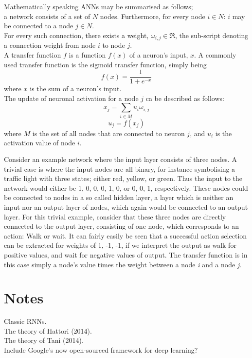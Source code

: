 \\
\\
Mathematically speaking ANNs may be summarised as follows;
\\
a network consists of a set of $N$ nodes. Furthermore, for every node $i\in N$: $i$ may be connected to a node $j \in N$.
\\
For every such connection, there exists a weight, $\omega_{i,j} \in \Re$, the sub-script denoting a connection weight from node $i$ to node $j$.
\\
A transfer function $f$ is a function $f(x)$ of a neuron's input, $x$. A commonly used transfer function is the sigmoid transfer function, simply being 
\begin{equation}
    f(x) = \frac{1}{1+e^{-x}}
\end{equation}
where $x$ is the sum of a neuron's input.
\\
The update of neuronal activation for a node $j$ ca be described as follows:
\\
\begin{equation}
    x_j = \sum_{i\in M} u_i \omega_{i,j}
\end{equation}
\begin{equation}
    u_j = f(x_j)
\end{equation}
where $M$ is the set of all nodes that are connected to neuron $j$, and $u_i$ is the activation value of node $i$.

Consider an example network where the input layer consists of three nodes. A trivial case is where the input nodes are all binary, for instance symbolising a traffic light with three states; either red, yellow, or green. Thus the input to the network would either be {1, 0, 0}, {0, 1, 0}, or {0, 0, 1}, respectively. These nodes could be connected to nodes in a so called hidden layer, a layer which is neither an input nor an output layer of nodes, which again would be connected to an output layer. For this trivial example, consider that these three nodes are directly connected to the output layer, consisting of one node, which corresponds to an action: Walk or wait. It can fairly easily be seen that a successful action selection can be extracted for weights of {1, -1, -1}, if we interpret the output as walk for positive values, and wait for negative values of output. The transfer function is in this case simply a node's value times the weight between a node \textit{i} and a node \textit{j}.


\section{Notes}
Classic RNNs.
\\
The theory of Hattori (2014).
\\
The theory of Tani (2014).
\\
Include Google's now open-sourced framework for deep learning?
\\


\cleardoublepage
